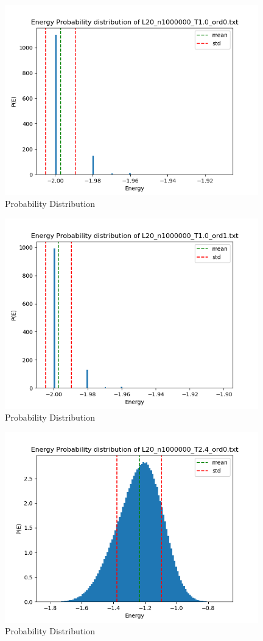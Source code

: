 \documentclass{article}
\begin{document}
\begin{figure}[ht]
    \centering
    \includegraphics[width = 11cm]{img/energyhistogram_L20_n1000000_T10_ord0.png}
    \caption{Probability Distribution}
    \label{fig:prob-lowT-ord0}
  \end{figure}

\begin{figure}[ht]
    \centering
    \includegraphics[width = 11cm]{img/energyhistogram_L20_n1000000_T10_ord1.png}
    \caption{Probability Distribution}
    \label{fig:prob-lowT-ord1}
  \end{figure}

\begin{figure}[ht]
    \centering
    \includegraphics[width = 11cm]{img/energyhistogram_L20_n1000000_T24_ord0.png}
    \caption{Probability Distribution}
    \label{fig:prob-highT-ord0}
  \end{figure}
\end{document}
